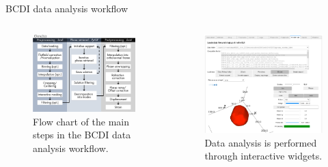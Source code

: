 \begin{frame}{BCDI data analysis workflow}
    \begin{columns}
        \begin{figure}
            \centering
            \includegraphics[width=\textwidth]{Figures/gwaihir/Packages.png}
            \caption{Flow chart of the main steps in the BCDI data analysis workflow.}
            \label{fig:Packages}
        \end{figure}
        

        \pause
        
        \begin{figure}
            \centering
            \includegraphics[width=\textwidth]{Figures/gwaihir/GUI_handle_tab.png}
            \caption{Data analysis is performed through interactive widgets.}
            \label{fig:GUI_handle_tab}
        \end{figure}


\end{columns}
\end{frame}
